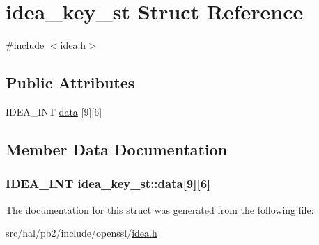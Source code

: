 \hypertarget{structidea__key__st}{}\section{idea\+\_\+key\+\_\+st Struct Reference}
\label{structidea__key__st}


{\ttfamily \#include $<$idea.\+h$>$}

\subsection*{Public Attributes}
\begin{DoxyCompactItemize}
\item 
I\+D\+E\+A\+\_\+\+I\+NT \hyperlink{structidea__key__st_aa6ba7317b0562f951492683464c0035e}{data} \mbox{[}9\mbox{]}\mbox{[}6\mbox{]}
\end{DoxyCompactItemize}


\subsection{Member Data Documentation}
\subsubsection[{\texorpdfstring{data}{data}}]{\setlength{\rightskip}{0pt plus 5cm}I\+D\+E\+A\+\_\+\+I\+NT idea\+\_\+key\+\_\+st\+::data\mbox{[}9\mbox{]}\mbox{[}6\mbox{]}}\hypertarget{structidea__key__st_aa6ba7317b0562f951492683464c0035e}{}\label{structidea__key__st_aa6ba7317b0562f951492683464c0035e}


The documentation for this struct was generated from the following file\+:\begin{DoxyCompactItemize}
\item 
src/hal/pb2/include/openssl/\hyperlink{idea_8h}{idea.\+h}\end{DoxyCompactItemize}
